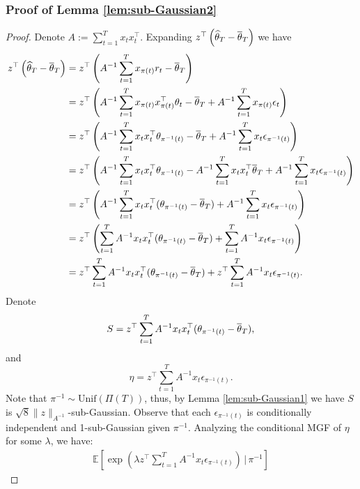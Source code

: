 \subsubsection{Proof of Lemma \ref{lem:sub-Gaussian2}}
\begin{proof}
 Denote $A := \sum_{t=1}^Tx_tx_t^\top$. Expanding $z^\top\left(\widehat{\theta}_T -\overline{\theta}_{T}\right)$ we have
    \begin{align*}
    z^\top\left(\widehat{\theta}_T -\overline{\theta}_{T}\right) &= z^\top\left(A^{-1} \sum_{t=1}^Tx_{\pi(t)}r_t - \overline{\theta}_{T}\right)\\
    &= z^\top\left(A^{-1}\sum_{t=1}^Tx_{\pi(t)}x_{\pi(t)}^\top\theta_t - \overline{\theta}_{T} + A^{-1}\sum_{t=1}^Tx_{\pi(t)}\epsilon_t\right) \\
    &= z^\top\left(A^{-1}\sum_{t=1}^Tx_tx_t^\top\theta_{\pi^{-1}(t)} - \overline{\theta}_{T} + A^{-1}\sum_{t=1}^Tx_{t}\epsilon_{\pi^{-1}(t)}\right)\\
        &= z^\top\left(A^{-1}\sum_{t=1}^Tx_tx_t^\top\theta_{\pi^{-1}(t)} - A^{-1}\sum_{t=1}^Tx_tx_t^\top\overline{\theta}_{T} + A^{-1}\sum_{t=1}^Tx_{t}\epsilon_{\pi^{-1}(t)}\right) \\
        &= z^\top\left(A^{-1}\sum_{t=1}^Tx_tx_t^\top(\theta_{\pi^{-1}(t)} - \overline{\theta}_{T}) + A^{-1}\sum_{t=1}^Tx_{t}\epsilon_{\pi^{-1}(t)}\right) \\
        &= z^\top\left(\sum_{t=1}^TA^{-1}x_tx_t^\top(\theta_{\pi^{-1}(t)} - \overline{\theta}_{T}) + \sum_{t=1}^TA^{-1}x_{t}\epsilon_{\pi^{-1}(t)}\right) \\
        &= z^\top\sum_{t=1}^TA^{-1}x_tx_t^\top(\theta_{\pi^{-1}(t)} - \overline{\theta}_{T}) + z^\top\sum_{t=1}^TA^{-1}x_{t}\epsilon_{\pi^{-1}(t)}.
    \end{align*}
    Denote \begin{equation}S = z^\top\sum_{t=1}^TA^{-1}x_tx_t^\top(\theta_{\pi^{-1}(t)} - \overline{\theta}_{T}),\end{equation}
    and \begin{equation}\eta = z^\top\sum_{t=1}^TA^{-1}x_{t}\epsilon_{\pi^{-1}(t)}.\end{equation}  Note that $\pi^{-1} \sim \mathrm{Unif}(\Pi(T))$, thus, by Lemma \ref{lem:sub-Gaussian1} we have $S$ is $\sqrt{8}\|z\|_{A^{-1}}$-sub-Gaussian. Observe that each $\epsilon_{\pi^{-1}(t)}$ is conditionally independent and 1-sub-Gaussian given $\pi^{-1}$. Analyzing the conditional MGF of $\eta$ for some $\lambda$, we have:
\begin{align*}
    \mathbb{E}\left[\exp\left(\lambda z^\top\sum_{t=1}^TA^{-1}x_{t}\epsilon_{\pi^{-1}(t)}\right) \, \Bigg | \, \pi^{-1} \right]

\end{align*}
\end{proof}
